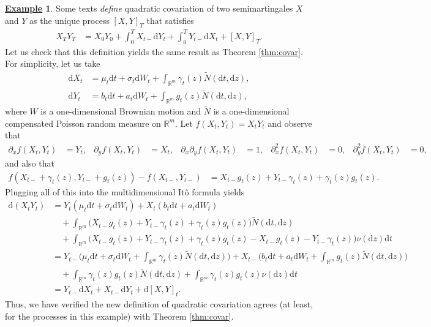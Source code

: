 \documentclass[12pt]{book}
\numberwithin{equation}{chapter}
\theoremstyle{plain}
\numberwithin{theorem}{section}
\theoremstyle{definition}
\newtheorem{example}[theorem]{\underline{Example}}
\numberwithin{exercise}{chapter}
\newcommand{\<}{\langle}
\renewcommand{\>}{\rangle}
\renewcommand{\(}{\left(}
\renewcommand{\)}{\right)}
\renewcommand{\[}{\left[}
\renewcommand{\]}{\right]}
\newcommand\Rb{\mathds{R}}
\newcommand\sig{\sigma}
\newcommand\gam{\gamma}
\newcommand\Nt{\widetilde{N}}
\renewcommand\d{\partial}
\newcommand\dd{\mathrm{d}}
\begin{document}
\begin{example}
Some texts \emph{define} quadratic covariation of two semimartingales $X$ and $Y$ as the unique process $[X,Y]_T$ that satisfies
\begin{align}
X_T Y_T
	&=	X_0 Y_0 + \int_0^T X_{t-} \dd Y_t + \int_0^T Y_{t-} \dd X_t + [X,Y]_T .
\end{align}
Let us check that this definition yields the same result as Theorem \ref{thm:covar}.  For simplicity, let us take
\begin{align}
\dd X_t
	&=	\mu_t \dd t + \sig_t \dd W_t + \int_{\Rb^m} \gam_t(z) \Nt( \dd t , \dd z ) , \\
\dd Y_t
	&=	b_t \dd t + a_t \dd W_t + \int_{\Rb^m} g_t(z) \Nt(\dd t ,\dd z ) ,
\end{align}
where $W$ is a one-dimensional Brownian motion and $\Nt$ is a one-dimensional compensated Poisson random measure on $\Rb^m$.
Let $f(X_t,Y_t) = X_t Y_t$ and observe that
\begin{align}
\d_x f(X_t,Y_t)
	&=	Y_t , &
\d_y f(X_t,Y_t)
	&=	X_t , &
\d_x \d_y f(X_t,Y_t)
	&=	1 ,  &
\d_x^2 f(X_t,Y_t)
	&=	0 , &
\d_y^2 f(X_t,Y_t)
	&=	0 , 
\end{align}
and also that
\begin{align}
f(X_{t-} + \gam_t(z), Y_{t-} + g_t(z) ) - f(X_{t-}, Y_{t-})
	&=	X_{t-} g_t(z)  + Y_{t-} \gam_t(z) + \gam_t(z) g_t(z) .
\end{align}
Plugging all of this into the multidimensional It\^o formula yields
\begin{align}
\dd ( X_t Y_t )
	&=	Y_t \( \mu_t \dd t + \sig_t \dd W_t \) + X_t \( b_t \dd t + a_t \dd W_t \) \\ &\quad
			+ \int_{\Rb^m} \Big( X_{t-} g_t(z)  + Y_{t-} \gam_t(z) + \gam_t(z) g_t(z) \Big) \Nt( \dd t, \dd z) \\ &\quad
			+	\int_{\Rb^m} \Big( X_{t-} g_t(z)  + Y_{t-} \gam_t(z) + \gam_t(z) g_t(z) - X_{t-} g_t(z) - Y_{t-} \gam_t(z) \Big) \nu( \dd z) \dd t \\
	&=	Y_{t-} \Big( \mu_t \dd t + \sig_t \dd W_t + \int_{\Rb^m} \gam_t(z) \Nt(\dd t, \dd z) \Big) 
			+ X_{t-} \Big( b_t \dd t + a_t \dd W_t + \int_{\Rb^m} g_t(z) \Nt(\dd t, \dd z) \Big) \\ &\quad
			+ \int_{\Rb^m} \gam_t(z) g_t(z) \Nt( \dd t, \dd z)
			+ \int_{\Rb^m} \gam_t(z) g_t(z) \nu( \dd z) \dd t \\
	&=	Y_{t-} \dd X_t + X_{t-} \dd Y_t + \dd[ X , Y ]_t .
\end{align}
Thus, we have verified the new definition of quadratic covariation agrees (at least, for the processes in this example) with Theorem \ref{thm:covar}.
\end{example}
\end{document}
